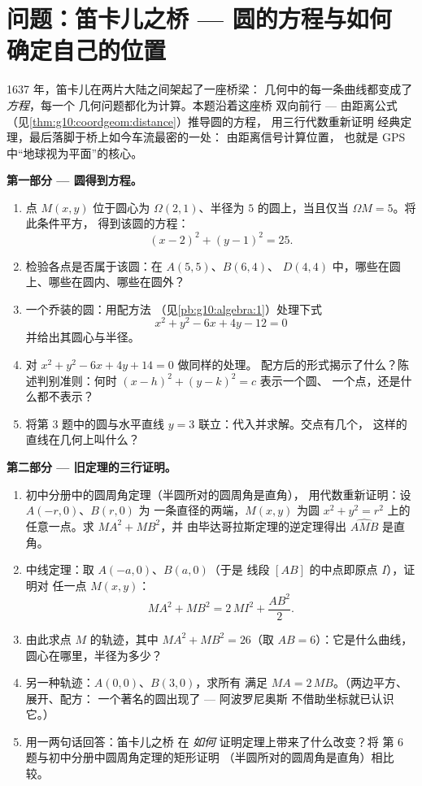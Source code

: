 \section{问题：笛卡儿之桥 --- 圆的方程与如何
确定自己的位置}

\begin{problem}
\label{pb:g10:coordgeom:1}
1637 年，笛卡儿在两片大陆之间架起了一座桥梁：
几何中的每一条曲线都变成了 \emph{方程}，每一个
几何问题都化为计算。本题沿着这座桥
双向前行 --- 由距离公式（见\cref{thm:g10:coordgeom:distance}）推导圆的方程，
用三行代数重新证明
经典定理，最后落脚于桥上如今车流最密的一处：
由距离信号计算位置，
也就是 GPS 中“地球视为平面”的核心。

\medskip
\noindent\textbf{第一部分 --- 圆得到方程。}
\begin{enumerate}
  \item 点 $M(x, y)$ 位于圆心为
        $\Omega(2, 1)$、半径为 $5$ 的圆上，当且仅当
        $\Omega M = 5$。将此条件平方，
        得到该圆的方程：
        \[
        (x - 2)^2 + (y - 1)^2 = 25 .
        \]
  \item 检验各点是否属于该圆：在 $A(5, 5)$、$B(6, 4)$、
        $D(4, 4)$ 中，哪些在圆上、哪些在圆内、哪些在圆外？
  \item 一个乔装的圆：用配方法
        （见\cref{pb:g10:algebra:1}）处理下式
        \[
        x^2 + y^2 - 6x + 4y - 12 = 0
        \]
        并给出其圆心与半径。
  \item 对 $x^2 + y^2 - 6x + 4y + 14 = 0$ 做同样的处理。
        配方后的形式揭示了什么？陈述判别准则：何时
        $(x - h)^2 + (y - k)^2 = c$ 表示一个圆、
        一个点，还是什么都不表示？
  \item 将第 3 题中的圆与水平直线
        $y = 3$ 联立：代入并求解。交点有几个，
        这样的直线在几何上叫什么？
\end{enumerate}

\medskip
\noindent\textbf{第二部分 --- 旧定理的三行证明。}
\begin{enumerate}[resume]
  \item 初中分册中的圆周角定理（半圆所对的圆周角是直角），
        用代数重新证明：设 $A(-r, 0)$、$B(r, 0)$ 为
        一条直径的两端，$M(x, y)$ 为圆
        $x^2 + y^2 = r^2$ 上的任意一点。求 $MA^2 + MB^2$，并
        由毕达哥拉斯定理的逆定理得出
        $\widehat{AMB}$ 是直角。
  \item 中线定理：取 $A(-a, 0)$、$B(a, 0)$（于是
        线段 $[AB]$ 的中点即原点 $I$），证明对
        任一点 $M(x, y)$：
        \[
        MA^2 + MB^2 = 2\,MI^2 + \frac{AB^2}{2} .
        \]
  \item 由此求点 $M$ 的轨迹，其中
        $MA^2 + MB^2 = 26$（取 $AB = 6$）：它是什么曲线，
        圆心在哪里，半径为多少？
  \item 另一种轨迹：$A(0,0)$、$B(3,0)$，求所有
        满足 $MA = 2\,MB$。（两边平方、展开、配方：
        一个著名的圆出现了 --- 阿波罗尼奥斯
        不借助坐标就已认识它。）
  \item 用一两句话回答：笛卡儿之桥
        在 \emph{如何} 证明定理上带来了什么改变？将
        第 6 题与初中分册中圆周角定理的矩形证明
        （半圆所对的圆周角是直角）相比较。
\end{enumerate}


\end{problem}
